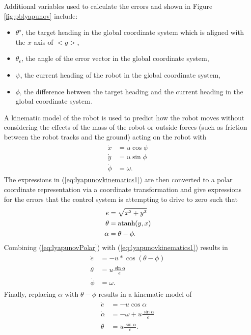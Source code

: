 Additional variables used to calculate the errors and shown in Figure \ref{fig:pblyapunov} include:
\begin{itemize}
\item $\theta^\star$, the target heading in the global coordinate system which is aligned with the $x$-axis of $<g>$,
\item $\theta_e$, the angle of the error vector in the global coordinate system,
\item $\psi$, the current heading of the robot in the global coordinate system,
\item $\phi$, the difference between the target heading and the current heading in the global coordinate system.
\end{itemize}

A kinematic model of the robot is used to predict how the robot moves without considering the effects of the mass of the robot or outside forces (such as friction between the robot tracks and the ground) acting on the robot with
\begin{align}
\label{eq:lyapunovkinematics1}
\begin{split}
\dot{x} &= u\cos\phi \\
\dot{y} &= u\sin\phi \\
\dot{\phi} &= \omega.
\end{split}
\end{align}
The expressions in (\ref{eq:lyapunovkinematics1}) are then converted to a polar coordinate representation via a coordinate transformation and give expressions for the errors that the control system is attempting to drive to zero such that
\begin{align}
\label{eq:lyapunovPolar}
\begin{split}
e &= \sqrt{x^2+y^2} \\
\theta &= \mathop{\text{atanh}}(y,x) \\
\alpha &= \theta - \phi.
\end{split}
\end{align}
Combining (\ref{eq:lyapunovPolar}) with (\ref{eq:lyapunovkinematics1}) results in
\begin{align*}
\begin{split}
\dot{e} &= -u*\cos(\theta-\phi) \\
\dot{\theta} &= u\frac{\sin\alpha}{e} \\
\dot{\phi} &= \omega.
\end{split}
\end{align*}
Finally, replacing $\alpha$ with $\theta-\phi$ results in a kinematic model of
\begin{align}
\label{eq:lyapunovkinematics}
\begin{split}
\dot{e} &= -u\cos\alpha \\
\dot{\alpha} &= -\omega + u\frac{\sin\alpha}{e} \\
\dot{\theta} &= u\frac{\sin\alpha}{e}.
\end{split}
\end{align}

